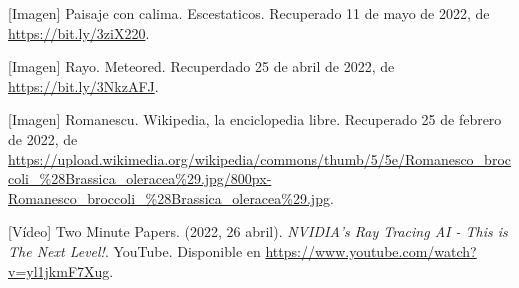 \begin{thebibliography}{99}
     [Imagen] Paisaje con calima. Escestaticos. Recuperado 11 de mayo de 2022, de \url{https://bit.ly/3ziX220}.

     [Imagen] Rayo. Meteored. Recuperdado 25 de abril de 2022, de \url{https://bit.ly/3NkzAFJ}.

     [Imagen] Romanescu. Wikipedia, la enciclopedia libre. Recuperado 25 de febrero de 2022, de \url{https://upload.wikimedia.org/wikipedia/commons/thumb/5/5e/Romanesco_broccoli_%28Brassica_oleracea%29.jpg/800px-Romanesco_broccoli_%28Brassica_oleracea%29.jpg}.

     [Vídeo] Two Minute Papers. (2022, 26 abril). \textit{NVIDIA’s Ray Tracing AI - This is The Next Level!}. YouTube. Disponible en \url{https://www.youtube.com/watch?v=yl1jkmF7Xug}.

\end{thebibliography}


